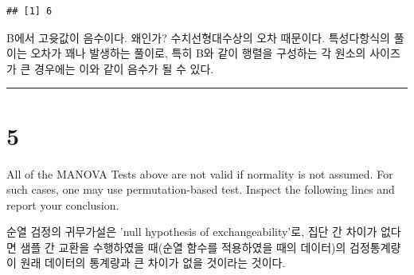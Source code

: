 \documentclass[
]{article}
\newenvironment{Shaded}{\begin{snugshade}}{\end{snugshade}}
\newcommand{\AttributeTok}[1]{\textcolor[rgb]{0.13,0.29,0.53}{#1}}
\newcommand{\CommentTok}[1]{\textcolor[rgb]{0.56,0.35,0.01}{\textit{#1}}}
\newcommand{\DecValTok}[1]{\textcolor[rgb]{0.00,0.00,0.81}{#1}}
\newcommand{\FunctionTok}[1]{\textcolor[rgb]{0.13,0.29,0.53}{\textbf{#1}}}
\newcommand{\NormalTok}[1]{#1}
\newcommand{\OtherTok}[1]{\textcolor[rgb]{0.56,0.35,0.01}{#1}}
\newcommand{\SpecialCharTok}[1]{\textcolor[rgb]{0.81,0.36,0.00}{\textbf{#1}}}
\newcommand{\StringTok}[1]{\textcolor[rgb]{0.31,0.60,0.02}{#1}}
\begin{document}
\begin{verbatim}
## [1] 6
\end{verbatim}

B에서 고윳값이 음수이다. 왜인가? 수치선형대수상의 오차 때문이다.
특성다항식의 풀이는 오차가 꽤나 발생하는 풀이로, 특히 B와 같이 행렬을
구성하는 각 원소의 사이즈가 큰 경우에는 이와 같이 음수가 될 수 있다.

\begin{center}\rule{0.5\linewidth}{0.5pt}\end{center}

\section{5}\label{section-4}

All of the MANOVA Tests above are not valid if normality is not assumed.
For such cases, one may use permutation-based test. Inspect the
following lines and report your conclusion.

순열 검정의 귀무가설은 'null hypothesis of exchangeability'로, 집단 간
차이가 없다면 샘플 간 교환을 수행하였을 때(순열 함수를 적용하였을 때의
데이터)의 검정통계량이 원래 데이터의 통계량과 큰 차이가 없을 것이라는
것이다.

\begin{Shaded}
\end{Shaded}
\end{document}
